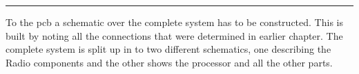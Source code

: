 \vspace{-10ex}%
\rule{\textwidth}{0.3pt}
\vspace{5ex}


To the \gls{pcb} a schematic over the complete system has to be constructed. This is built by noting all the connections that were determined in earlier chapter. The complete system is split up in to two different schematics, one describing the Radio components and the other shows the processor and all the other parts.